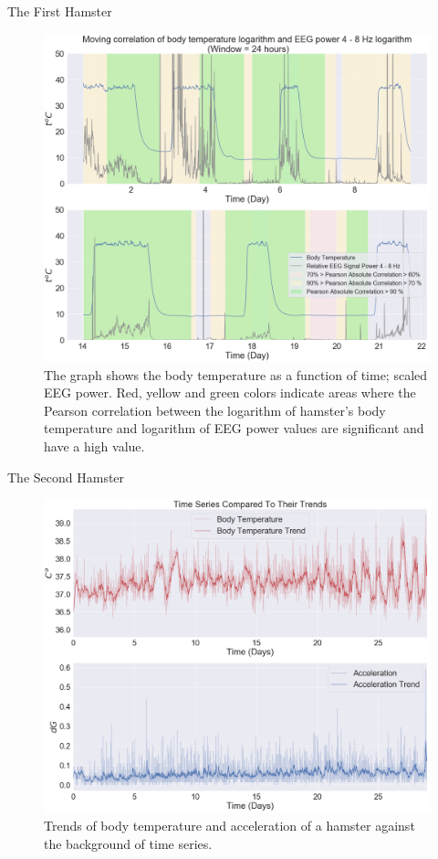 \documentclass[10pt]{beamer}
\begin{document}
\begin{frame}[fragile]{The First Hamster}
\begin{figure}[H]
\centering
\includegraphics[width=0.6\linewidth]{exp1_7.png}
\caption{The graph shows the body temperature as a function of time; scaled EEG power. Red, yellow and green colors indicate areas where the Pearson correlation between the logarithm of hamster's body temperature and logarithm of EEG power values are significant and have a high value.}\label{fig:lactate_receptors}
\end{figure}
\end{frame}

\begin{frame}[fragile]{The Second Hamster}
\begin{figure}[H]
\centering
\includegraphics[width=0.6\linewidth]{exp2_1.png}
\caption{Trends of body temperature and acceleration of a hamster against the background of time series.}\label{fig:lactate_receptors}
\end{figure}
\end{frame}
\end{document}
